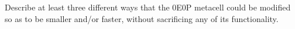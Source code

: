 \begin{multicols}{2}
	\mfilbreak
	
	
	\begin{problem}\label{exer:0e0p_how_make_faster} 
		Describe at least three different ways that the 0E0P metacell could be modified so as to be smaller and/or faster, without sacrificing any of its functionality.
	\end{problem}
	
	
\end{multicols}
\normalsize\vspace*{0.01cm}
